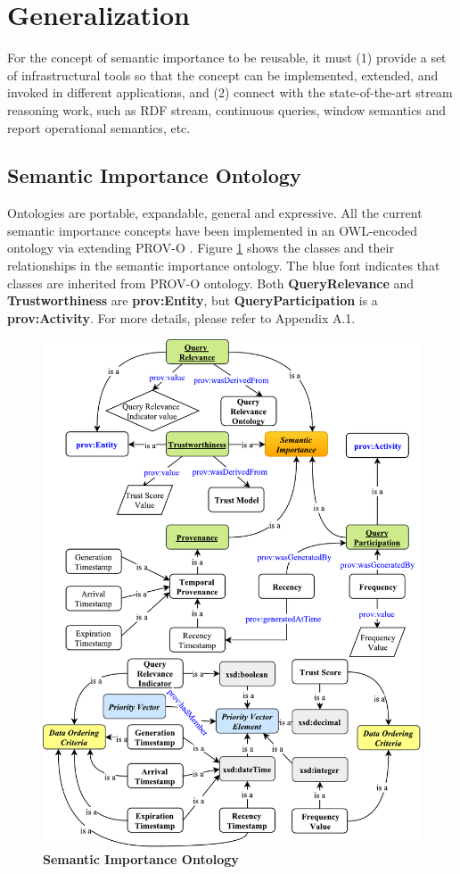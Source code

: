 \section{Generalization}
For the concept of semantic importance to be reusable, it must 
(1) provide a set of infrastructural tools so that the concept can be implemented, extended, and invoked in different applications, 
and (2) connect with the state-of-the-art stream reasoning work, such as RDF stream, continuous queries, window semantics and report operational semantics, etc.
%
\subsection{Semantic Importance Ontology}
Ontologies are portable, expandable, general and expressive.
All the current semantic importance concepts have been implemented in an OWL-encoded ontology via extending PROV-O \cite{lebo2013prov}.
Figure \ref{fig:6-sicr} shows the classes and their relationships in the semantic importance ontology. 
The blue font indicates that classes are inherited from PROV-O ontology. 
Both \textbf{QueryRelevance} and \textbf{Trustworthiness} are \textbf{prov:Entity}, but \textbf{QueryParticipation} is a \textbf{prov:Activity}.
For more details, please refer to Appendix A.1. 

\begin{figure}[!htbp]
    \centering
    \includegraphics[width=5in]{img/6-sicr.pdf}
    \caption{\textbf{Semantic Importance Ontology}}
    \label{fig:6-sicr}
\end{figure}
%
